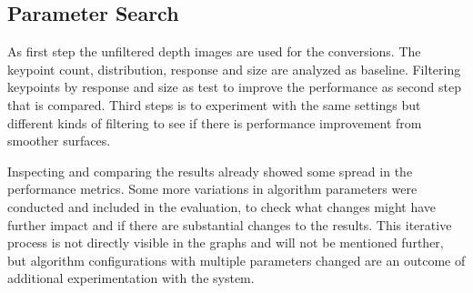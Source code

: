 \subsection{Parameter Search}

As first step the unfiltered depth images are used for the conversions.
The keypoint count, distribution, response and size are analyzed as baseline.
Filtering keypoints by response and size as test to improve the performance as second step that is compared.
Third steps is to experiment with the same settings but different kinds of filtering to see if there is performance improvement from smoother surfaces.

Inspecting and comparing the results already showed some spread in the performance metrics.
Some more variations in algorithm parameters were conducted and included in the evaluation, to check what changes might have further impact and if there are substantial changes to the results.
This iterative process is not directly visible in the graphs and will not be mentioned further, but algorithm configurations with multiple parameters changed are an outcome of additional experimentation with the system.
